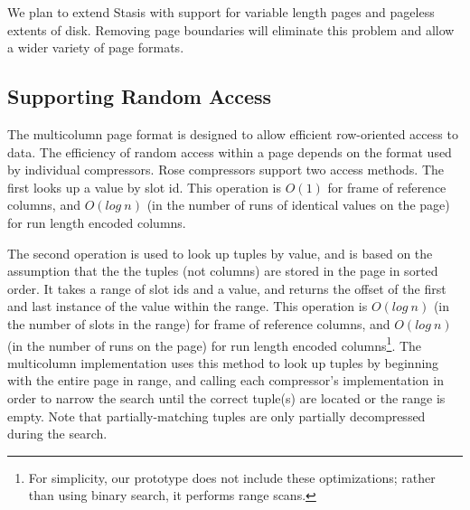 \documentclass{vldb}
\newcommand{\rows}{Rose\xspace}
\newcommand{\rowss}{Rose's\xspace}
\begin{document}
We plan to extend Stasis with support for variable length pages and
pageless extents of disk.  Removing page boundaries will eliminate
this problem and allow a wider variety of page formats.




\subsection{Supporting Random Access}

The multicolumn page format is designed to allow efficient
row-oriented access to data.  The efficiency of random access within a
page depends on the format used by individual compressors.  \rows
compressors support two access methods.  The first looks up a value by
slot id.  This operation is $O(1)$ for frame of reference columns, and
$O(log~n)$ (in the number of runs of identical values on the page) for
run length encoded columns.

The second operation is used to look up tuples by value, and is based
on the assumption that the the tuples (not columns) are stored in the page in sorted
order.  It takes a range of slot ids and a value, and returns the
offset of the first and last instance of the value within the range.
This operation is $O(log~n)$ (in the number of slots in the range)
for frame of reference columns, and $O(log~n)$ (in the number of runs
on the page) for run length encoded columns\footnote{For simplicity,
our prototype does not include these optimizations; rather than using
binary search, it performs range scans.}.  The multicolumn
implementation uses this method to look up tuples by beginning with
the entire page in range, and calling each compressor's implementation
in order to narrow the search until the correct tuple(s) are located
or the range is empty.  Note that partially-matching tuples are only
partially decompressed during the search.
\end{document}

